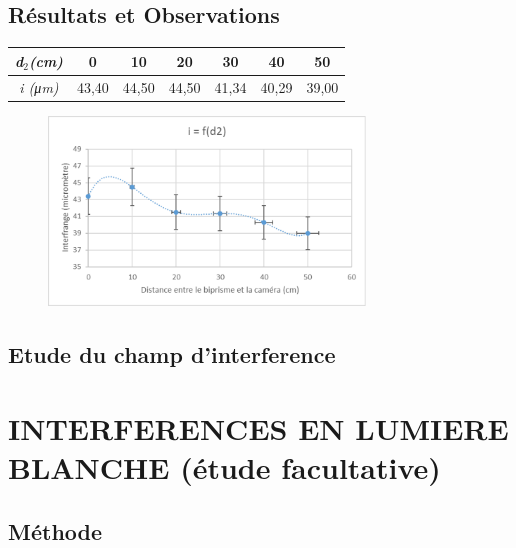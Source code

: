 \documentclass[11pt, a4paper]{article}
\begin{document}
\subsection{Résultats et Observations}
    \bigskip
    \begin{table}[htbp]
    \centering
    \begin{tabular}{|c|c|c|c|c|c|c|}
        \hline  
        \textit{d$_{2}$(cm)}&0
        &10
        &20
        &30
        &40
        &50
        \\
        \hline
        \textit{i (μm)}&43,40
        &44,50
        &44,50
        &41,34
        &40,29
        &39,00 
        \\
        \hline 
    \end{tabular}
    \end{table}
    \begin{figure}[htbp] %
        \centering %
        \includegraphics[width=0.75\textwidth]{courbe2} %
        \label{courbe2}%
    \end{figure}
\subsection{Etude du champ d’interference}

\section{INTERFERENCES EN LUMIERE BLANCHE (étude facultative)}
\subsection{Méthode}
\end{document}
